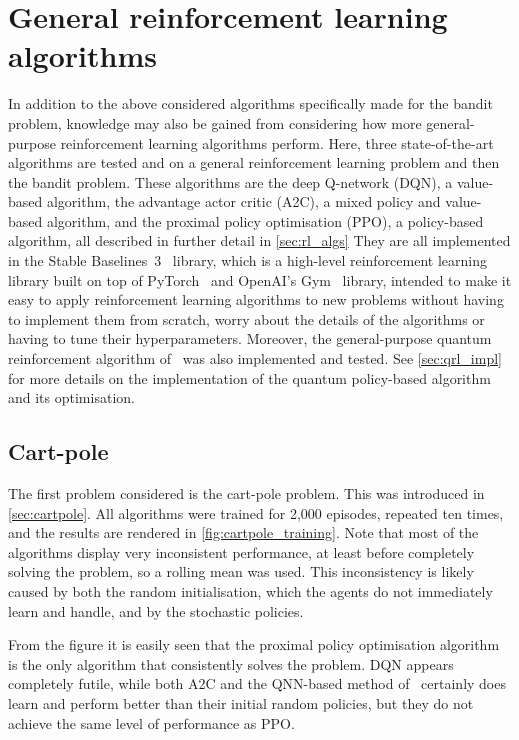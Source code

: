 \section{General reinforcement learning algorithms}
\label{sec:sim_rl}

In addition to the above considered algorithms specifically made for the bandit problem, knowledge may also be gained from considering how more general-purpose reinforcement learning algorithms perform.
Here, three state-of-the-art algorithms are tested and on a general reinforcement learning problem and then the bandit problem.
These algorithms are the deep Q-network (DQN), a value-based algorithm, the advantage actor critic (A2C), a mixed policy and value-based algorithm, and the proximal policy optimisation (PPO), a policy-based algorithm, all described in further detail in \cref{sec:rl_algs}
They are all implemented in the Stable Baselines~3~\autocite{sb3} library, which is a high-level reinforcement learning library built on top of PyTorch~\autocite{pytorch} and OpenAI's Gym~\autocite{gym} library, intended to make it easy to apply reinforcement learning algorithms to new problems without having to implement them from scratch, worry about the details of the algorithms or having to tune their hyperparameters.
Moreover, the general-purpose quantum reinforcement algorithm of~\autocite{jerbi2021} was also implemented and tested.
See \cref{sec:qrl_impl} for more details on the implementation of the quantum policy-based algorithm and its optimisation.

\subsection{Cart-pole}
\label{sec:sim_rl_cartpole}

The first problem considered is the cart-pole problem.
This was introduced in \cref{sec:cartpole}.
All algorithms were trained for 2,000 episodes, repeated ten times, and the results are rendered in \cref{fig:cartpole_training}.
Note that most of the algorithms display very inconsistent performance, at least before completely solving the problem, so a rolling mean was used.
This inconsistency is likely caused by both the random initialisation, which the agents do not immediately learn and handle, and by the stochastic policies.

From the figure it is easily seen that the proximal policy optimisation algorithm is the only algorithm that consistently solves the problem.
DQN appears completely futile, while both A2C and the QNN-based method of~\autocite{jerbi2021} certainly does learn and perform better than their initial random policies, but they do not achieve the same level of performance as PPO.


